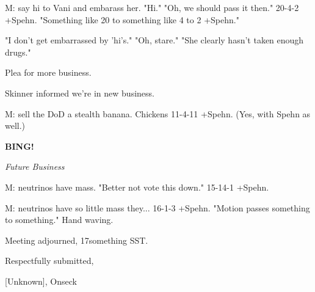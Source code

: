 \documentclass[12pt]{article}
\newcommand{\bing}{{\bf BING!} }
\newcommand{\goto}[1]{\bing \vskip 12pt \centerline{{\em{#1}}}}
\begin{document}
M: say hi to Vani and embarass her. "Hi." "Oh, we should pass it then." 20-4-2 +Spehn. "Something like 20 to something like 4 to 2 +Spehn."

"I don't get embarrassed by 'hi's." "Oh, stare." "She clearly hasn't taken enough drugs."

Plea for more business.

Skinner informed we're in new business.

M: sell the DoD a stealth banana. Chickens 11-4-11 +Spehn. (Yes, with Spehn as well.)

\goto{Future Business}

M: neutrinos have mass. "Better not vote this down." 15-14-1 +Spehn.

M: neutrinos have so little mass they... 16-1-3 +Spehn. "Motion passes something to something." Hand waving.

\vspace{12pt}

\noindent
Meeting adjourned, 17something SST.

\vspace{18pt}

\centerline{Respectfully submitted,}
\centerline{[Unknown], Onseck}
\end{document}
